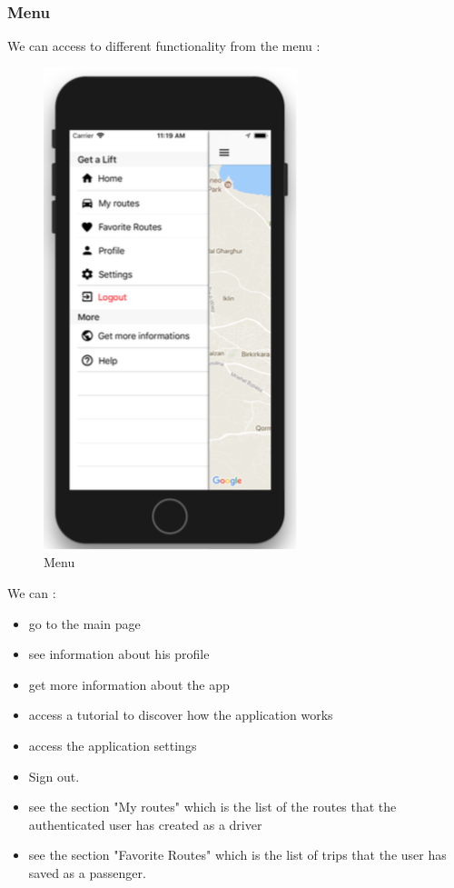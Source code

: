 \subsubsection{Menu}

We can access to different functionality from the menu :
\begin{figure}[h!]
\begin{center}
\includegraphics[scale = 0.3]{diagrams/Menu.png} 
\end{center}
\caption{Menu}
\end{figure}

We can :
\begin{itemize}
\item go to the main page
\item see information about his profile
\item get more information about the app
\item access a tutorial to discover how the application works
\item access the application settings
\item Sign out.
\item see the section "My routes" which is the list of the routes that the authenticated user has created as a driver
\item see the section "Favorite Routes" which is the list of trips that the user has saved as a passenger.
\end{itemize}

